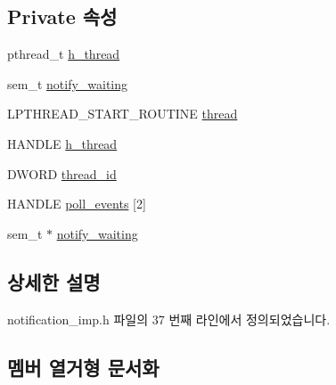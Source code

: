 \subsection*{Private 속성}
\begin{DoxyCompactItemize}
\item 
pthread\+\_\+t \hyperlink{classavdecc__lib_1_1notification__imp_a6e4816698fce9da1e93d69ecbcc78506}{h\+\_\+thread}
\item 
sem\+\_\+t \hyperlink{classavdecc__lib_1_1notification__imp_a5e84b919a152418fd41a1c1a7b18d547}{notify\+\_\+waiting}
\item 
L\+P\+T\+H\+R\+E\+A\+D\+\_\+\+S\+T\+A\+R\+T\+\_\+\+R\+O\+U\+T\+I\+NE \hyperlink{classavdecc__lib_1_1notification__imp_aa930d342e4c53bcc9bf4da7995c81a3b}{thread}
\item 
H\+A\+N\+D\+LE \hyperlink{classavdecc__lib_1_1notification__imp_a38f9e2153b3e3dadac999c7c45549cf6}{h\+\_\+thread}
\item 
D\+W\+O\+RD \hyperlink{classavdecc__lib_1_1notification__imp_afb0cb0dfb6676a8802089b63ae981f37}{thread\+\_\+id}
\item 
H\+A\+N\+D\+LE \hyperlink{classavdecc__lib_1_1notification__imp_a7178c7ad92d526f120bd0ae68b50f53e}{poll\+\_\+events} \mbox{[}2\mbox{]}
\item 
sem\+\_\+t $\ast$ \hyperlink{classavdecc__lib_1_1notification__imp_a5fc48c08fa6fd448474c147a8e88b7f7}{notify\+\_\+waiting}
\end{DoxyCompactItemize}


\subsection{상세한 설명}


notification\+\_\+imp.\+h 파일의 37 번째 라인에서 정의되었습니다.



\subsection{멤버 열거형 문서화}
